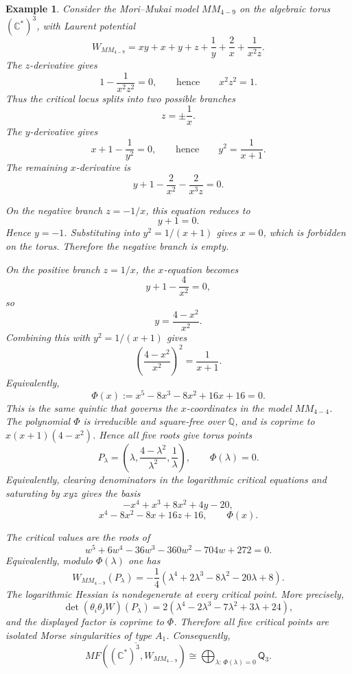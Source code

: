 \documentclass[11pt]{amsart}
\newtheorem{example}{Example}[section]
\newcommand{\MorseCat}[1]{\mathsf{Q}_{#1}}
\begin{document}
\begin{example}
Consider the Mori--Mukai model $MM_{4-9}$ on the algebraic torus
$(\mathbb{C}^*)^3$, with Laurent potential
\[
W_{MM_{4-9}}=xy+x+y+z+\frac{1}{y}+\frac{2}{x}+\frac{1}{x^2z}.
\]
The $z$-derivative gives
\[
1-\frac{1}{x^2z^2}=0,
\qquad\text{hence}\qquad
x^2z^2=1.
\]
Thus the critical locus splits into two possible branches
\[
z=\pm\frac{1}{x}.
\]
The $y$-derivative gives
\[
x+1-\frac{1}{y^2}=0,
\qquad\text{hence}\qquad
y^2=\frac{1}{x+1}.
\]
The remaining $x$-derivative is
\[
y+1-\frac{2}{x^2}-\frac{2}{x^3z}=0.
\]

On the negative branch $z=-1/x$, this equation reduces to
\[
y+1=0.
\]
Hence $y=-1$. Substituting into $y^2=1/(x+1)$ gives $x=0$, which is
forbidden on the torus. Therefore the negative branch is empty.

On the positive branch $z=1/x$, the $x$-equation becomes
\[
y+1-\frac{4}{x^2}=0,
\]
so
\[
y=\frac{4-x^2}{x^2}.
\]
Combining this with $y^2=1/(x+1)$ gives
\[
\left(\frac{4-x^2}{x^2}\right)^2=\frac{1}{x+1}.
\]
Equivalently,
\[
\Phi(x):=x^5-8x^3-8x^2+16x+16=0.
\]
This is the same quintic that governs the $x$-coordinates in the model
$MM_{4-4}$. The polynomial $\Phi$ is irreducible and square-free over
$\mathbb{Q}$, and is coprime to $x(x+1)(4-x^2)$. Hence all five roots give
torus points
\[
P_\lambda=\left(
\lambda,
\frac{4-\lambda^2}{\lambda^2},
\frac{1}{\lambda}
\right),
\qquad
\Phi(\lambda)=0.
\]
Equivalently, clearing denominators in the logarithmic critical equations and
saturating by $xyz$ gives the basis
\[
-x^4+x^3+8x^2+4y-20,
\]
\[
x^4-8x^2-8x+16z+16,
\qquad
\Phi(x).
\]

The critical values are the roots of
\[
w^5+6w^4-36w^3-360w^2-704w+272=0.
\]
Equivalently, modulo $\Phi(\lambda)$ one has
\[
W_{MM_{4-9}}(P_\lambda)=
-\frac{1}{4}(\lambda^4+2\lambda^3-8\lambda^2-20\lambda+8).
\]
The logarithmic Hessian is nondegenerate at every critical point. More
precisely,
\[
\det(\theta_i\theta_jW)(P_\lambda)
=2(\lambda^4-2\lambda^3-7\lambda^2+3\lambda+24),
\]
and the displayed factor is coprime to $\Phi$. Therefore all five critical
points are isolated Morse singularities of type $A_1$. Consequently,
\[
\overline{MF((\mathbb{C}^*)^3,W_{MM_{4-9}})}
\cong \bigoplus_{\lambda:\,\Phi(\lambda)=0}\MorseCat{3}.
\]
\end{example}
\end{document}
